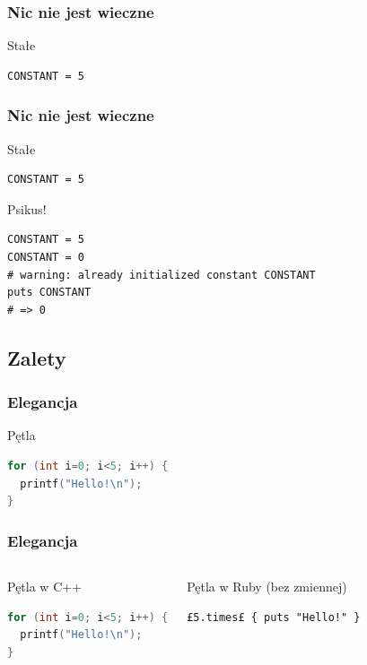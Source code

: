 
\begin{frame}[fragile]
\frametitle{Nic nie jest wieczne}
\begin{block}{Stałe}
\begin{lstlisting}[style=Ruby]
CONSTANT = 5
\end{lstlisting}
\end{block}
\end{frame}

\begin{frame}[fragile]
\frametitle{Nic nie jest wieczne}
\begin{block}{Stałe}
\begin{lstlisting}[style=Ruby]
CONSTANT = 5
\end{lstlisting}
\end{block}
\begin{block}{Psikus!}
\begin{lstlisting}[style=Ruby]
CONSTANT = 5
CONSTANT = 0
# warning: already initialized constant CONSTANT
puts CONSTANT
# => 0
\end{lstlisting}
\end{block}
\end{frame}


\subsection{Zalety}


\begin{frame}[fragile]
\frametitle{Elegancja}
\begin{block}{Pętla}
\begin{lstlisting}[language=C++]
for (int i=0; i<5; i++) {
  printf("Hello!\n");
}
\end{lstlisting}
\end{block}
\end{frame}


\begin{frame}[fragile]
\frametitle{Elegancja}
\begin{columns}
 \column{5cm}
    \begin{block}{Pętla w C++}
\begin{lstlisting}[language=C++]
for (int i=0; i<5; i++) {
  printf("Hello!\n");
}
\end{lstlisting}
    \end{block}
 \column{5cm}
    \begin{block}{Pętla w Ruby (bez zmiennej)}
\begin{lstlisting}[style=Ruby]
£5.times£ { puts "Hello!" }
\end{lstlisting}
    \end{block}
\end{columns}
\end{frame}

